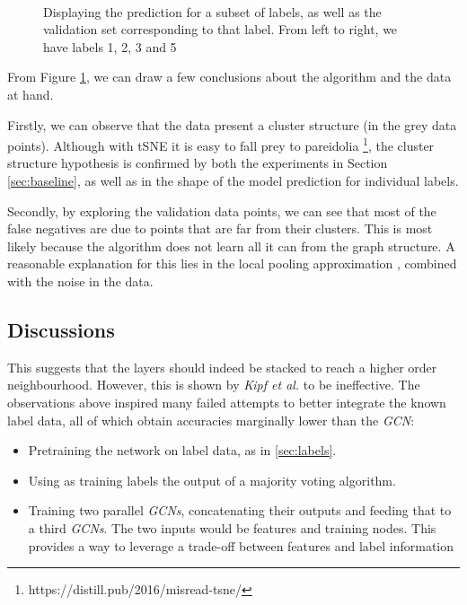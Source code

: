 \documentclass[10pt,a4]{article}
\begin{document}
    \begin{figure}[h!]
        \centering
        \mbox{
        }
        \mbox{
        }
        \caption{Displaying the prediction for a subset of labels, as well as the 
        validation set corresponding to that label. From left to right, we have 
        labels 1, 2, 3 and 5}
        \label{fig:dimred}
    \end{figure}
    From Figure \ref{fig:dimred}, we can draw a few conclusions about the algorithm
    and the data at hand. 
    
    Firstly, we can observe that the data present a cluster structure (in the grey 
    data points). Although with tSNE it is easy to fall prey to pareidolia 
    \footnote{https://distill.pub/2016/misread-tsne/}, the cluster structure 
    hypothesis is confirmed by both the experiments in Section \ref{sec:baseline}, 
    as well as in the shape of the model prediction for individual labels.
    
    Secondly, by exploring the validation data points, we can see that most of 
    the false negatives are due to points that are far from their clusters. This 
    is most likely because the algorithm does not learn all it can from the 
    graph structure. A reasonable explanation for this lies in the local pooling 
    approximation \cite{kipf2016semi}, combined with the noise in the data. 
    
    \subsection{Discussions}

    This suggests that the layers should indeed be stacked to reach a higher order 
    neighbourhood. However, this is shown  by \emph{Kipf et al.}\cite{kipf2016semi} 
    to be ineffective. The observations above inspired many failed attempts 
    to better integrate the known label data, all of which obtain accuracies 
    marginally lower than the \emph{GCN}:
    \begin{itemize}
        \item Pretraining the network on label data, as in \ref{sec:labels}.
        \item Using as training labels the output of a majority voting algorithm.
        \item Training two parallel \emph{GCNs}, concatenating their outputs and 
        feeding that to a third \emph{GCNs}. The two inputs would be features 
        and training nodes. This provides a way to leverage a trade-off between 
        features and label information
    \end{itemize}
\end{document}
